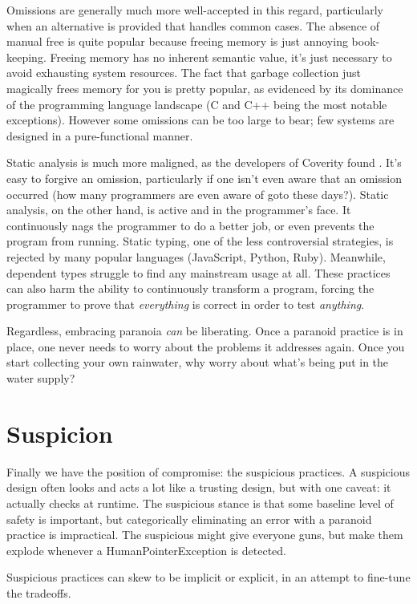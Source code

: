 Omissions are generally much more well-accepted in this regard, particularly
when an alternative is provided that handles common cases. The
absence of manual free is quite popular because freeing memory is just annoying
book-keeping. Freeing memory has no inherent semantic value, it's just necessary
to avoid exhausting system resources. The fact that garbage collection just
magically frees memory for you is pretty popular, as evidenced by its dominance
of the programming language landscape (C and C++ being the most notable exceptions).
However some omissions can be too large to bear; few systems are designed in
a pure-functional manner.

Static analysis is much more maligned, as the developers of Coverity found
\cite{bessey2010few}. It's easy to forgive an omission, particularly if one isn't
even aware that an omission occurred (how many programmers are even aware of
goto these days?). Static analysis, on the other hand, is active and in the programmer's face.
It continuously nags the programmer to do a better job, or even prevents the
program from running. Static typing, one of the less controversial
strategies, is rejected by many popular languages (JavaScript, Python, Ruby).
Meanwhile, dependent types struggle to find any mainstream usage at all. These practices
can also harm the ability to continuously transform a program, forcing the
programmer to prove that \emph{everything} is correct in order to test \emph{anything}.

Regardless, embracing paranoia \emph{can} be liberating. Once a paranoid
practice is in place, one never needs to worry about the problems it addresses
again. Once you start collecting your own rainwater, why worry about what's being put
in the water supply?




\section{Suspicion}

Finally we have the position of compromise: the suspicious practices. A suspicious
design often looks and acts a lot like a trusting design, but with one caveat: it
actually checks at runtime. The suspicious stance is that some baseline level of
safety is important, but categorically eliminating an error with a paranoid practice
is impractical. The suspicious might give everyone guns, but make them explode whenever
a HumanPointerException is detected.

Suspicious practices can skew to be implicit or explicit, in an
attempt to fine-tune the tradeoffs.

